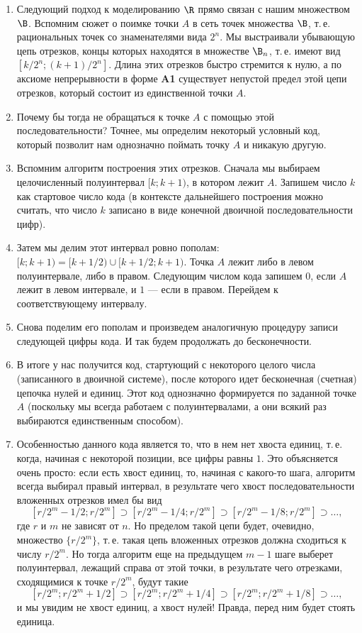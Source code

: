 \begin{enumerate}
\item Следующий подход к моделированию $\R$ прямо связан с нашим множеством $\B$. Вспомним сюжет о поимке точки $A$ в сеть точек множества $\B$, т.\,е. рациональных точек со знаменателями вида $2^n$. Мы выстраивали убывающую цепь отрезков, концы которых находятся в множестве $\B_n$, т.\,е. имеют вид $[k/2^n;(k+1)/2^n]$. Длина этих отрезков быстро стремится к нулю, а по аксиоме непрерывности в форме \textbf{A1} существует непустой предел этой цепи отрезков, который состоит из единственной точки $A$.
\item Почему бы тогда не обращаться к точке $A$ с помощью этой последовательности? Точнее, мы определим некоторый условный код, который позволит нам однозначно поймать точку $A$ и никакую другую.
\item Вспомним алгоритм построения этих отрезков. Сначала мы выбираем целочисленный полуинтервал $[k;k+1)$, в котором лежит $A$. Запишем число $k$ как стартовое число кода (в контексте дальнейшего построения можно считать, что число $k$ записано в виде конечной двоичной последовательности цифр).
\item Затем мы делим этот интервал ровно пополам: $[k;k+1)=[k+1/2)\cup[k+1/2;k+1)$. Точка $A$ лежит либо в левом полуинтервале, либо в правом. Следующим числом кода запишем $0$, если $A$ лежит в левом интервале, и $1$ --- если в правом. Перейдем к соответствующему интервалу.
\item Снова поделим его пополам и произведем аналогичную процедуру записи следующей цифры кода. И так будем продолжать до бесконечности.
\item В итоге у нас получится код, стартующий с некоторого целого числа (записанного в двоичной системе), после которого идет бесконечная (счетная) цепочка нулей и единиц. Этот код однозначно формируется по заданной точке $A$ (поскольку мы всегда работаем с полуинтервалами, а они всякий раз выбираются единственным способом).
\item Особенностью данного кода является то, что в нем нет хвоста единиц, т.\,е. когда, начиная с некоторой позиции, все цифры равны $1$. Это объясняется очень просто: если есть хвост единиц, то, начиная с какого-то шага, алгоритм всегда выбирал правый интервал, в результате чего хвост последовательности вложенных отрезков имел бы вид
$$
[r/2^m-1/2;r/2^m]\supset[r/2^m-1/4;r/2^m]\supset[r/2^m-1/8;r/2^m]\supset\dots,
$$
где $r$ и $m$ не зависят от $n$. Но пределом такой цепи будет, очевидно, множество $\{r/2^m\}$, т.\,е. такая цепь вложенных отрезков должна сходиться к числу $r/2^m$. Но тогда алгоритм еще на предыдущем $m-1$ шаге выберет полуинтервал, лежащий справа от этой точки, в результате чего отрезками, сходящимися к точке $r/2^m$, будут такие
$$
[r/2^m;r/2^m+1/2]\supset[r/2^m;r/2^m+1/4]\supset[r/2^m;r/2^m+1/8]\supset\dots,
$$
и мы увидим не хвост единиц, а хвост нулей! Правда, перед ним будет стоять единица.


\end{enumerate}
